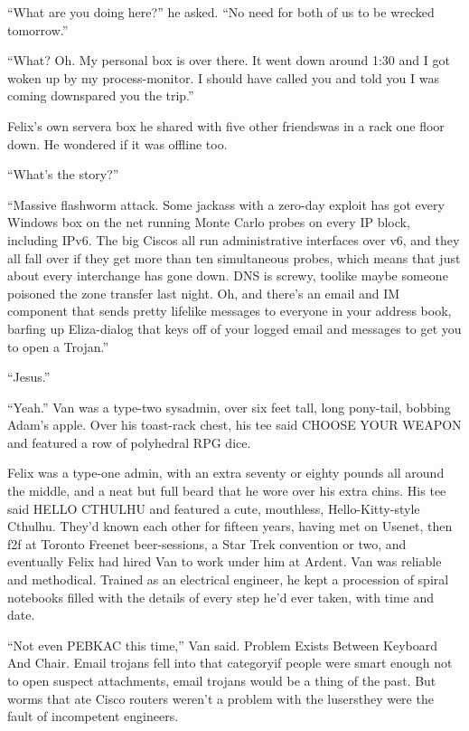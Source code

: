 “What are you doing here?” he asked. “No need for both of us to be
wrecked tomorrow.”

“What? Oh. My personal box is over there. It went down around 1:30
and I got woken up by my process-monitor. I should have called you
and told you I was coming down\dash{}spared you the trip.”

Felix’s own server\dash{}a box he shared with five other friends\dash{}was in a
rack one floor down. He wondered if it was offline too.

“What’s the story?”

“Massive flashworm attack. Some jackass with a zero-day exploit has
got every Windows box on the net running Monte Carlo probes on
every IP block, including IPv6. The big Ciscos all run
administrative interfaces over v6, and they all fall over if they
get more than ten simultaneous probes, which means that just about
every interchange has gone down. DNS is screwy, too\dash{}like maybe
someone poisoned the zone transfer last night. Oh, and there’s an
email and IM component that sends pretty lifelike messages to
everyone in your address book, barfing up Eliza-dialog that keys
off of your logged email and messages to get you to open a
Trojan.”

“Jesus.”

“Yeah.” Van was a type-two sysadmin, over six feet tall, long
pony-tail, bobbing Adam’s apple. Over his toast-rack chest, his tee
said CHOOSE YOUR WEAPON and featured a row of polyhedral RPG dice.

Felix was a type-one admin, with an extra seventy or eighty pounds
all around the middle, and a neat but full beard that he wore over
his extra chins. His tee said HELLO CTHULHU and featured a cute,
mouthless, Hello-Kitty-style Cthulhu. They’d known each other for
fifteen years, having met on Usenet, then f2f at Toronto Freenet
beer-sessions, a Star Trek convention or two, and eventually Felix
had hired Van to work under him at Ardent. Van was reliable and
methodical. Trained as an electrical engineer, he kept a procession
of spiral notebooks filled with the details of every step he’d ever
taken, with time and date.

“Not even PEBKAC this time,” Van said. Problem Exists Between
Keyboard And Chair. Email trojans fell into that category\dash{}if people
were smart enough not to open suspect attachments, email trojans
would be a thing of the past. But worms that ate Cisco routers
weren’t a problem with the lusers\dash{}they were the fault of
incompetent engineers.

